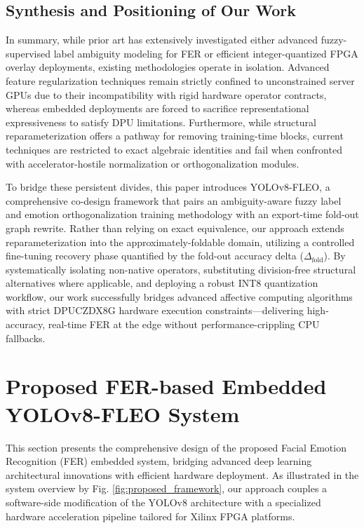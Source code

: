 \documentclass[algorithms,article,submit,moreauthors]{Definitions/mdpi}
\begin{document}
\subsection{Synthesis and Positioning of Our Work}

In summary, while prior art has extensively investigated either advanced fuzzy-supervised label ambiguity modeling for FER or efficient integer-quantized FPGA overlay deployments, existing methodologies operate in isolation. Advanced feature regularization techniques remain strictly confined to unconstrained server GPUs due to their incompatibility with rigid hardware operator contracts, whereas embedded deployments are forced to sacrifice representational expressiveness to satisfy DPU limitations. Furthermore, while structural reparameterization offers a pathway for removing training-time blocks, current techniques are restricted to exact algebraic identities and fail when confronted with accelerator-hostile normalization or orthogonalization modules. 

To bridge these persistent divides, this paper introduces YOLOv8-FLEO, a comprehensive co-design framework that pairs an ambiguity-aware fuzzy label and emotion orthogonalization training methodology with an export-time fold-out graph rewrite. Rather than relying on exact equivalence, our approach extends reparameterization into the approximately-foldable domain, utilizing a controlled fine-tuning recovery phase quantified by the fold-out accuracy delta ($\Delta_{\mathrm{fold}}$). By systematically isolating non-native operators, substituting division-free structural alternatives where applicable, and deploying a robust INT8 quantization workflow, our work successfully bridges advanced affective computing algorithms with strict DPUCZDX8G hardware execution constraints—delivering high-accuracy, real-time FER at the edge without performance-crippling CPU fallbacks.

\section{Proposed FER-based Embedded YOLOv8-FLEO System}\label{sec:method}
This section presents the comprehensive design of the proposed Facial Emotion Recognition (FER) embedded system, bridging advanced deep learning architectural innovations with efficient hardware deployment. As illustrated in the system overview by Fig. \ref{fig:proposed_framework}, our approach couples a software-side modification of the YOLOv8 architecture with a specialized hardware acceleration pipeline tailored for Xilinx FPGA platforms.
\end{document}
